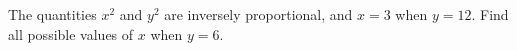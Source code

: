 The quantities $x^2$ and $y^2$ are inversely proportional, and $x=3$ when $y=12$. Find all possible values of $x$ when $y=6$.
